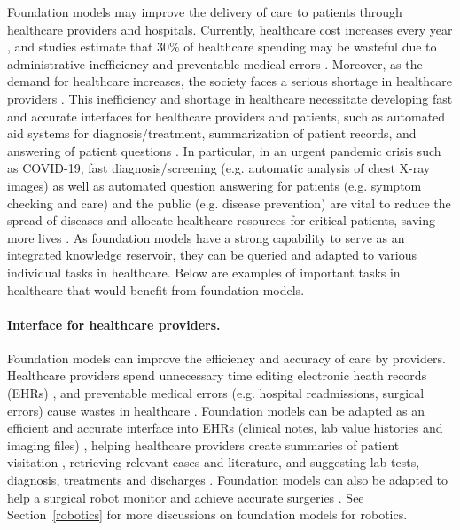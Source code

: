 Foundation models may improve the delivery of care to patients through healthcare providers and hospitals. Currently, healthcare cost increases every year \citep{keehan2020national}, and studies estimate that 30\% of healthcare spending may be wasteful due to administrative inefficiency and preventable medical errors \citep{kocher2021reducing}. Moreover, as the demand for healthcare increases, the society faces a serious shortage in healthcare providers \citep{kirch2017addressing}. This inefficiency and shortage in healthcare necessitate developing fast and accurate interfaces for healthcare providers and patients, such as automated aid systems for diagnosis/treatment, summarization of patient records, and answering of patient questions \citep{davenport2019potential,nie2018deeptag,wang2021domain}. In particular, in an urgent pandemic crisis such as COVID-19, fast diagnosis/screening (e.g. automatic analysis of chest X-ray images) as well as automated question answering for patients (e.g. symptom checking and care) and the public (e.g. disease prevention) are vital to reduce the spread of diseases and allocate healthcare resources for critical patients, saving more lives \citep{lalmuanawma2020applications}. As foundation models have a strong capability to serve as an integrated knowledge reservoir, they can be queried and adapted to various individual tasks in healthcare. Below are examples of important tasks in healthcare that would benefit from foundation models.

\paragraph{Interface for healthcare providers.} Foundation models can improve the efficiency and accuracy of care by providers. Healthcare providers spend unnecessary time editing electronic heath records (EHRs) \citep{kocher2021reducing}, and preventable medical errors (e.g. hospital readmissions, surgical errors) cause wastes in healthcare \citep{shrank2019waste,shah2020surgical}. Foundation models can be adapted as an efficient and accurate interface into EHRs (clinical notes, lab value histories and imaging files) \citep{li2020behrt,steinberg2021language,percha2021modern}, helping healthcare providers create summaries of patient visitation \citep{krishna2020generating}, retrieving relevant cases and literature, and suggesting lab tests, diagnosis, treatments and discharges \citep{zhang2019vettag,rasmy2021med}. Foundation models can also be adapted to help a surgical robot monitor and achieve accurate surgeries \citep{diana2015robotic,agrigoroaie2016developing,yu2019reinforcement}. See Section~\ref{robotics} for more discussions on foundation models for robotics. 

